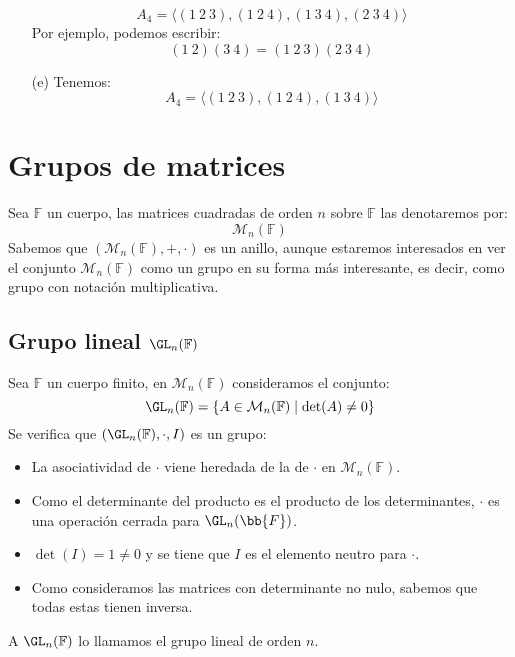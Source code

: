 \begin{ejemplo}
\begin{enumerate}[label=(\alph*)]
\begin{equation*}
                    A_4 = \langle (1\ 2\ 3), (1\ 2\ 4), (1\ 3\ 4), (2\ 3\ 4) \rangle 
                \end{equation*}
                Por ejemplo, podemos escribir:
                \begin{equation*}
                    (1\ 2)(3\ 4) = (1\ 2\ 3)(2\ 3\ 4)
                \end{equation*}
            \item[(e)] Tenemos:
                \begin{equation*}
                    A_4 = \langle (1\ 2\ 3), (1\ 2\ 4), (1\ 3\ 4) \rangle 
                \end{equation*}
    \end{enumerate}
\end{ejemplo}

\section{Grupos de matrices}
Sea $\mathbb{F}$ un cuerpo, las matrices cuadradas de orden $n$ sobre $\mathbb{F}$ las denotaremos por:
\begin{equation*}
    \mathcal{M}_n(\mathbb{F})
\end{equation*}
Sabemos que $(\mathcal{M}_n(\mathbb{F}), +, \cdot)$ es un anillo, aunque estaremos interesados en ver el conjunto $\mathcal{M}_n(\mathbb{F})$ como un grupo en su forma más interesante, es decir, como grupo con notación multiplicativa.

\subsection{Grupo lineal $\GL_n(\mathbb{F})$}
\begin{definicion} Sea $\mathbb{F}$ un cuerpo finito, en $\mathcal{M}_n(\mathbb{F})$ consideramos el conjunto:
    \begin{equation*}
        \GL_n(\mathbb{F}) = \{A\in \mathcal{M}_n(\mathbb{F}) \mid \det(A) \neq 0\}
    \end{equation*}
    Se verifica que $(\GL_n(\mathbb{F}),\cdot,I)$ es un grupo:
    \begin{itemize}
        \item La asociatividad de $\cdot $ viene heredada de la de $\cdot $ en $\mathcal{M}_n(\mathbb{F})$.
        \item Como el determinante del producto es el producto de los determinantes, $\cdot $ es una operación cerrada para $\GL_n(\bb{F})$.
        \item $\det(I)=1\neq 0$ y se tiene que $I$ es el elemento neutro para $\cdot $.
        \item Como consideramos las matrices con determinante no nulo, sabemos que todas estas tienen inversa.
    \end{itemize}
    A $\GL_n(\mathbb{F})$ lo llamamos el grupo lineal de orden $n$.
\end{definicion}

